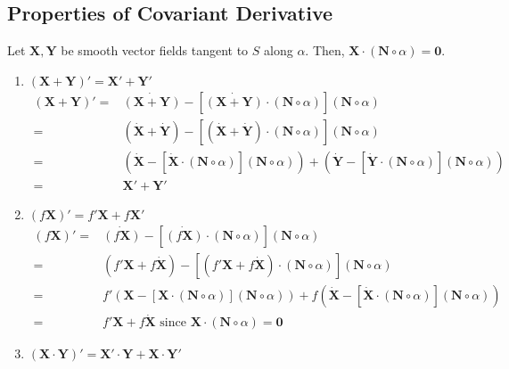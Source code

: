 \subsection{Properties of Covariant Derivative}
Let $\mathbf{X},\mathbf{Y}$ be smooth vector fields tangent to $S$ along $\alpha$.
Then, $\mathbf{X} \cdot (\mathbf{N} \circ \alpha) = \mathbf{0}$.
\begin{enumerate}
	\item $(\mathbf{X}+\mathbf{Y})' = \mathbf{X}'+\mathbf{Y}'$\\
	\begin{align*}
		(\mathbf{X} + \mathbf{Y})' = & \dot{(\mathbf{X}+\mathbf{Y})} - [\dot{(\mathbf{X}+\mathbf{Y})} \cdot (\mathbf{N} \circ \alpha)] (\mathbf{N} \circ \alpha) \\
		= & (\dot{\mathbf{X}} + \dot{\mathbf{Y}}) - [(\dot{\mathbf{X}} + \dot{\mathbf{Y}}) \cdot (\mathbf{N} \circ \alpha)] (\mathbf{N} \circ \alpha) \\
		= & \left( \dot{\mathbf{X}} - \left[ \dot{\mathbf{X}} \cdot (\mathbf{N} \circ \alpha) \right] (\mathbf{N} \circ \alpha) \right) + \left( \dot{\mathbf{Y}} - \left[ \dot{\mathbf{Y}} \cdot (\mathbf{N} \circ \alpha) \right] (\mathbf{N} \circ \alpha) \right)\\
		= & \mathbf{X}' + \mathbf{Y}'
	\end{align*}
	\item $(f\mathbf{X})' = f'\mathbf{X} + f\mathbf{X}'$\\
	\begin{align*}
		(f\mathbf{X})' = & \dot{(f\mathbf{X})} - \left[ \dot{(f\mathbf{X})} \cdot (\mathbf{N} \circ \alpha) \right] (\mathbf{N} \circ \alpha) \\
		= & \left( f'\mathbf{X} + f\dot{\mathbf{X}} \right) - \left[ (f'\mathbf{X} + f\dot{\mathbf{X}}) \cdot (\mathbf{N}\circ\alpha) \right] (\mathbf{N} \circ \alpha) \\
		= & f'\left( \mathbf{X}-\left[ \mathbf{X} \cdot (\mathbf{N} \circ \alpha) \right] (\mathbf{N} \circ \alpha) \right) + f\left( \dot{\mathbf{X}} - \left[ \dot{\mathbf{X}} \cdot (\mathbf{N} \circ \alpha) \right] (\mathbf{N} \circ \alpha) \right) \\
		= & f'\mathbf{X} + f \dot{\mathbf{X}} \text{ since } \mathbf{X} \cdot (\mathbf{N} \circ \alpha) = \mathbf{0}
	\end{align*}
	\item $(\mathbf{X} \cdot \mathbf{Y})' = \mathbf{X}' \cdot \mathbf{Y} + \mathbf{X} \cdot \mathbf{Y}'$\\
	\begin{align*}

\end{align*}
\end{enumerate}
